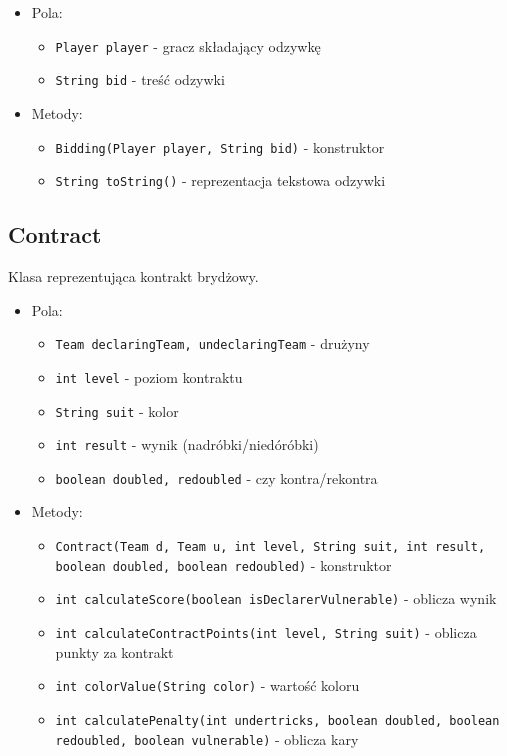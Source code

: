 \documentclass{article}
\begin{document}
\begin{itemize}
    \item Pola:
    \begin{itemize}
        \item \texttt{Player player} - gracz składający odzywkę
        \item \texttt{String bid} - treść odzywki
    \end{itemize}
    
    \item Metody:
    \begin{itemize}
        \item \texttt{Bidding(Player player, String bid)} - konstruktor
        \item \texttt{String toString()} - reprezentacja tekstowa odzywki
    \end{itemize}
\end{itemize}

\subsection{Contract}
Klasa reprezentująca kontrakt brydżowy.

\begin{itemize}
    \item Pola:
    \begin{itemize}
        \item \texttt{Team declaringTeam, undeclaringTeam} - drużyny
        \item \texttt{int level} - poziom kontraktu
        \item \texttt{String suit} - kolor
        \item \texttt{int result} - wynik (nadróbki/niedóróbki)
        \item \texttt{boolean doubled, redoubled} - czy kontra/rekontra
    \end{itemize}
    
    \item Metody:
    \begin{itemize}
        \item \texttt{Contract(Team d, Team u, int level, String suit, int result, boolean doubled, boolean redoubled)} - konstruktor
        \item \texttt{int calculateScore(boolean isDeclarerVulnerable)} - oblicza wynik
        \item \texttt{int calculateContractPoints(int level, String suit)} - oblicza punkty za kontrakt
        \item \texttt{int colorValue(String color)} - wartość koloru
        \item \texttt{int calculatePenalty(int undertricks, boolean doubled, boolean redoubled, boolean vulnerable)} - oblicza kary
    \end{itemize}
\end{itemize}
\end{document}
